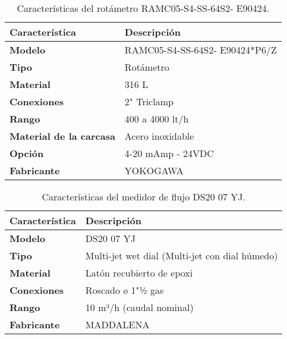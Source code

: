 \begin{table}[H]
    \centering
    \caption{Características del rotámetro RAMC05-S4-SS-64S2- E90424.}
    \label{table:sensor_transmisor_flujo}
    \begin{tabular}{| L{6cm} | L{6cm} |}
        \hline
        \textbf{Característica} & \textbf{Descripción}  \\
        \hline
        \textbf{Modelo} & RAMC05-S4-SS-64S2- E90424*P6/Z  \\
        \hline
        \textbf{Tipo} & Rotámetro  \\
        \hline
        \textbf{Material} & 316 L  \\
        \hline
        \textbf{Conexiones} & 2" Triclamp  \\
        \hline
        \textbf{Rango} & 400 a 4000 lt/h  \\
        \hline
        \textbf{Material de la carcasa} & Acero inoxidable  \\
        \hline
        \textbf{Opción} & 4-20 mAmp - 24VDC  \\
        \hline
        \textbf{Fabricante} & YOKOGAWA  \\
        \hline
    \end{tabular}
\end{table}



\begin{table}[H]
    \centering
    \caption{Características del medidor de flujo DS20 07 YJ.}
    \label{table:sensor_transmisor_flujo2}
    \begin{tabular}{| L{6cm} | L{6cm} |}
        \hline
        \textbf{Característica} & \textbf{Descripción}  \\
        \hline
        \textbf{Modelo} & DS20 07 YJ  \\
        \hline
        \textbf{Tipo} & Multi-jet wet dial (Multi-jet con dial húmedo)  \\
        \hline
        \textbf{Material} & Latón recubierto de epoxi  \\
        \hline
        \textbf{Conexiones} & Roscado ø 1"½ gas  \\
        \hline
        \textbf{Rango} & 10 m³/h (caudal nominal)  \\
        \hline
        \textbf{Fabricante} & MADDALENA  \\
        \hline
    \end{tabular}
\end{table}

